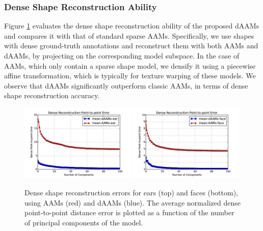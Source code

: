 \subsubsection{Dense Shape Reconstruction Ability}

Figure \ref{fig:rc_face} evaluates the dense shape reconstruction ability of the proposed dAAMs and compares it with that of standard sparse AAMs. Specifically, we use shapes with dense ground-truth annotations and reconstruct them with both AAMs and dAAMs, by projecting on the corresponding model subspace. In the case of AAMs, which only contain a sparse shape model, we densify it using a piecewise affine transformation, which is typically for texture warping of these models. We observe that dAAMs significantly outperform classic AAMs, in terms of dense shape reconstruction accuracy.
\begin{figure}
    \centering
    \includegraphics[width=0.49\textwidth,trim={0 0 0 25pt},clip]{resources/Annotation_Correction/Suplementory_Meterial/Model_Analysis/sr_ear}
    \includegraphics[width=0.49\textwidth,trim={0 0 0 25pt},clip]{resources/Annotation_Correction/Suplementory_Meterial/Model_Analysis/sr_face}
    \caption{Dense shape reconstruction errors for ears (top) and faces (bottom), using AAMs (red) and dAAMs (blue). The average normalized dense point-to-point distance error is plotted as a function of the number of principal components of the model.}
    \label{fig:rc_face}
\end{figure}

